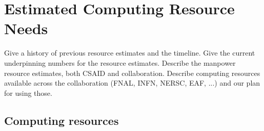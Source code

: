\section{Estimated Computing Resource Needs}
\label{sec:resources}
Give a history of previous resource estimates and the timeline.
Give the current underpinning numbers for the resource estimates.
Describe the manpower resource estimates, both CSAID and collaboration.
Describe computing resources available across the collaboration (FNAL, INFN, NERSC, EAF, ...) and our plan for using those.


\subsection{Computing resources}



